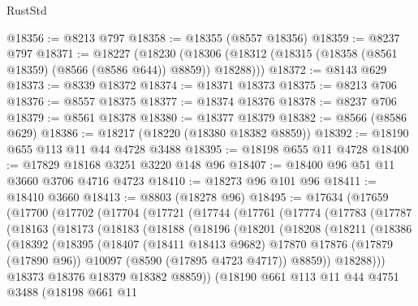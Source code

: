 \begin{lexlean}{RustStd}
\begin{coremodule}
@18356 := @8213 @797
@18358 := @18355 (@8557 @18356)
@18359 := @8237 @797
@18371 := @18227
    (@18230 (@18306 (@18312 (@18315 (@18358 (@8561 @18359) (@8566 (@8586 @644)) @8859)) @18288)))
@18372 := @8143 @629
@18373 := @8339 @18372
@18374 := @18371 @18373
@18375 := @8213 @706
@18376 := @8557 @18375
@18377 := @18374 @18376
@18378 := @8237 @706
@18379 := @8561 @18378
@18380 := @18377 @18379
@18382 := @8566 (@8586 @629)
@18386 := @18217 (@18220 (@18380 @18382 @8859))
@18392 := @18190 @655 @113 @11 @44 @4728 @3488
@18395 := @18198 @655 @11 @4728
@18400 := @17829 @18168 @3251 @3220 @148 @96
@18407 := @18400 @96 @51 @11 @3660 @3706 @4716 @4723
@18410 := @18273 @96 @101 @96
@18411 := @18410 @3660
@18413 := @8803 (@18278 @96)
@18495 := @17634
    (@17659
      (@17700
        (@17702
          (@17704
            (@17721
              (@17744
                (@17761
                  (@17774
                    (@17783
                      (@17787
                        (@18163
                          (@18173
                            (@18183
                              (@18188
                                (@18196
                                  (@18201
                                    (@18208
                                      (@18211
                                        (@18386
                                          (@18392
                                            (@18395
                                              (@18407
                                                (@18411 @18413 @9682)
                                                @17870
                                                @17876
                                                (@17879 (@17890 @96))
                                                @10097
                                                (@8590 (@17895 @4723 @4717))
                                                @8859))
                                            @18288)))
                                      @18373
                                      @18376
                                      @18379
                                      @18382
                                      @8859))
                                  (@18190
                                    @661
                                    @113
                                    @11
                                    @44
                                    @4751
                                    @3488
                                    (@18198
                                      @661
                                      @11

\end{coremodule}
\end{lexlean}
